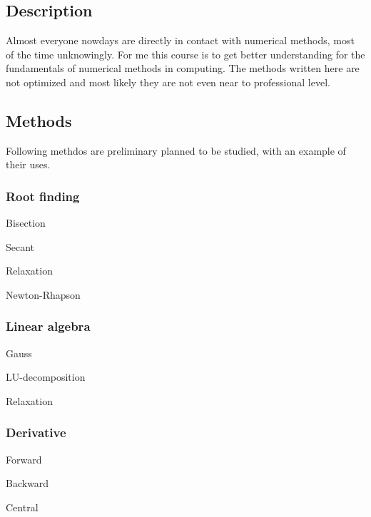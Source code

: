 \subsection*{Description}

Almost everyone nowdays are directly in contact with numerical methods, most of the time unknowingly. For me this course is to get better understanding for the fundamentals of numerical methods in computing. The methods written here are not optimized and most likely they are not even near to professional level.

\subsection*{Methods}

Following methdos are preliminary planned to be studied, with an example of their uses.

\subsubsection*{Root finding}


\begin{DoxyItemize}
\item Bisection
\item Secant
\item Relaxation
\item Newton-\/\+Rhapson
\end{DoxyItemize}

\subsubsection*{Linear algebra}


\begin{DoxyItemize}
\item Gauss
\item L\+U-\/decomposition
\item Relaxation
\end{DoxyItemize}

\subsubsection*{Derivative}


\begin{DoxyItemize}
\item Forward
\item Backward
\item Central
\end{DoxyItemize}


